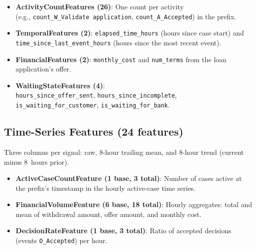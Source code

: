 \documentclass[runningheads]{llncs}
\begin{document}
\begin{itemize}
    \item \textbf{ActivityCountFeatures (26)}: One count per activity\\
          \quad(e.g., \texttt{count\_W\_Validate application},
          \texttt{count\_A\_Accepted}) in the prefix.
    \item \textbf{TemporalFeatures (2)}:
          \texttt{elapsed\_time\_hours} (hours since case start) and
          \texttt{time\_since\_last\_event\_hours} (hours since the
          most recent event).
    \item \textbf{FinancialFeatures (2)}:
          \texttt{monthly\_cost} and \texttt{num\_terms}
          from the loan application's offer.
    \item \textbf{WaitingStateFeatures (4)}:\\
          \texttt{hours\_since\_offer\_sent},
          \texttt{hours\_since\_incomplete},\\
          \texttt{is\_waiting\_for\_customer},
          \texttt{is\_waiting\_for\_bank}.
\end{itemize}

\subsection{Time-Series Features (24 features)}

Three columns per signal: raw, 8-hour trailing mean,
and 8-hour trend (current minus 8~hours prior).

\begin{itemize}
    \item \textbf{ActiveCaseCountFeature (1 base, 3 total)}:
          Number of cases active at the prefix's timestamp in the hourly
          active-case time series.
    \item \textbf{FinancialVolumeFeature (6 base, 18 total)}:
          Hourly aggregates: total and mean of withdrawal amount,
          offer amount, and monthly cost.
    \item \textbf{DecisionRateFeature (1 base, 3 total)}:
          Ratio of accepted decisions (events \texttt{O\_Accepted})
          per hour.
\end{itemize}
\end{document}
